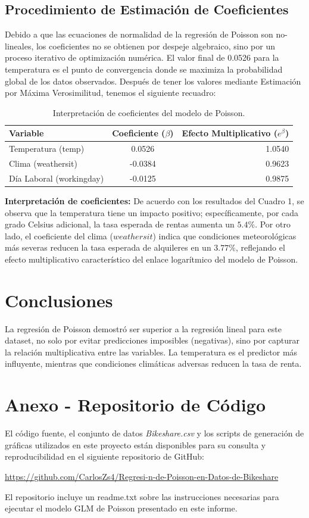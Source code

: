 \documentclass[12pt,a4paper]{article}
\begin{document}
\subsection{Procedimiento de Estimación de Coeficientes}
Debido a que las ecuaciones de normalidad de la regresión de Poisson son no-lineales, los coeficientes no se obtienen por despeje algebraico, sino por un proceso iterativo de optimización numérica. El valor final de 0.0526 para la temperatura es el punto de convergencia donde se maximiza la probabilidad global de los datos observados. Después de tener los valores mediante Estimación por Máxima Verosimilitud, tenemos el siguiente recuadro:

\begin{table}[H]
\centering
\begin{tabular}{lcr}
\toprule
Variable & Coeficiente ($\beta$) & Efecto Multiplicativo ($e^\beta$) \\
\midrule
Temperatura (temp) & 0.0526 & 1.0540 \\
Clima (weathersit) & -0.0384 & 0.9623 \\
Día Laboral (workingday) & -0.0125 & 0.9875 \\
\bottomrule
\end{tabular}
\caption{Interpretación de coeficientes del modelo de Poisson.}
\end{table}

\textbf{Interpretación de coeficientes:} 
De acuerdo con los resultados del Cuadro 1, se observa que la temperatura tiene un impacto positivo; específicamente, por cada grado Celsius adicional, la tasa esperada de rentas aumenta un $5.4\%$. Por otro lado, el coeficiente del clima ($weathersit$) indica que condiciones meteorológicas más severas reducen la tasa esperada de alquileres en un $3.77\%$, reflejando el efecto multiplicativo característico del enlace logarítmico del modelo de Poisson.

\section{Conclusiones}
La regresión de Poisson demostró ser superior a la regresión lineal para este dataset, no solo por evitar predicciones imposibles (negativas), sino por capturar la relación multiplicativa entre las variables. La temperatura es el predictor más influyente, mientras que condiciones climáticas adversas reducen la tasa de renta.

\section{Anexo - Repositorio de Código}
El código fuente, el conjunto de datos \textit{Bikeshare.csv} y los scripts de generación de gráficas utilizados en este proyecto están disponibles para su consulta y reproducibilidad en el siguiente repositorio de GitHub:

\vspace{0.3cm}
\url{https://github.com/CarlosZs4/Regresi-n-de-Poisson-en-Datos-de-Bikeshare}
\vspace{0.3cm}

El repositorio incluye un readme.txt sobre las instrucciones necesarias para ejecutar el modelo GLM de Poisson presentado en este informe.
\end{document}
